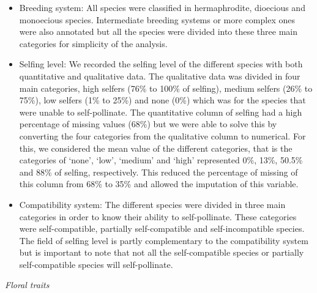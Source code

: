 \documentclass[
  12pt,
]{article}
\begin{document}
\begin{itemize}
\item
  Breeding system: All species were classified in hermaphrodite,
  dioecious and monoecious species. Intermediate breeding systems or
  more complex ones were also annotated but all the species were divided
  into these three main categories for simplicity of the analysis.
\item
  Selfing level: We recorded the selfing level of the different species
  with both quantitative and qualitative data. The qualitative data was
  divided in four main categories, high selfers (76\% to 100\% of
  selfing), medium selfers (26\% to 75\%), low selfers (1\% to 25\%) and
  none (0\%) which was for the species that were unable to
  self-pollinate. The quantitative column of selfing had a high
  percentage of missing values (68\%) but we were able to solve this by
  converting the four categories from the qualitative column to
  numerical. For this, we considered the mean value of the different
  categories, that is the categories of `none', `low', `medium' and
  `high' represented 0\%, 13\%, 50.5\% and 88\% of selfing,
  respectively. This reduced the percentage of missing of this column
  from 68\% to 35\% and allowed the imputation of this variable.
\item
  Compatibility system: The different species were divided in three main
  categories in order to know their ability to self-pollinate. These
  categories were self-compatible, partially self-compatible and
  self-incompatible species. The field of selfing level is partly
  complementary to the compatibility system but is important to note
  that not all the self-compatible species or partially self-compatible
  species will self-pollinate.
\end{itemize}

\emph{Floral traits}
\end{document}

